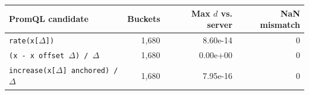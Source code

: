 \begin{tabular}{@{}lrrr@{}}
\toprule
PromQL candidate & Buckets & Max $d$ vs. server & NaN mismatch \\
\midrule
\texttt{rate(x[$\Delta$])} & 1,680 & 8.60e-14 & 0 \\
\texttt{(x - x offset $\Delta$) / $\Delta$} & 1,680 & 0.00e+00 & 0 \\
\texttt{increase(x[$\Delta$] anchored) / $\Delta$} & 1,680 & 7.95e-16 & 0 \\
\bottomrule
\end{tabular}
